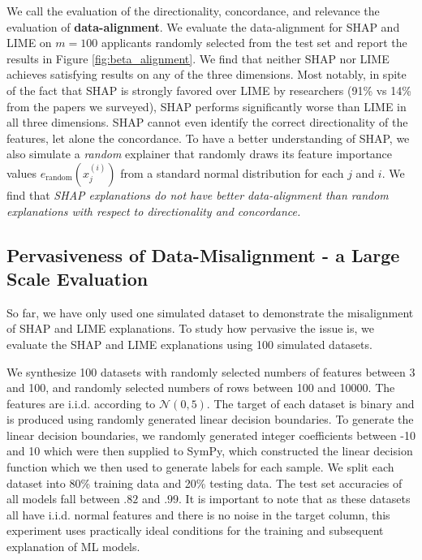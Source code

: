 \documentclass[mnsc,blindrev]{informs3}
\begin{document}
  We call the evaluation of the directionality, concordance, and relevance the evaluation of \textbf{data-alignment}. We evaluate the data-alignment
 for SHAP and LIME on $m=100$ applicants randomly selected from the test set and report the results in Figure \ref{fig:beta_alignment}. 
 We find that neither SHAP nor LIME achieves satisfying results on any of the three dimensions. Most notably, in spite of the fact that SHAP is strongly favored over LIME by researchers (91\% vs 14\% from the papers we surveyed), SHAP performs significantly worse than LIME in all three dimensions. SHAP cannot even identify the correct directionality of the features, let alone the concordance. To have a better understanding of SHAP, we also simulate a \emph{random} explainer that randomly draws its feature importance values $e_\text{random}(x^{(i)}_j)$ from a standard normal distribution for each $j$ and $i$. We find that \emph{SHAP explanations do not have better data-alignment than random explanations  with respect to directionality and concordance.}         


\subsection{Pervasiveness of Data-Misalignment - a Large Scale Evaluation}
    \label{sec:pervasive}
    So far, we have only used one simulated dataset to demonstrate the misalignment of SHAP and LIME explanations. To study how pervasive the issue is, %
    we evaluate the SHAP and LIME explanations using 100 simulated datasets.
    
    We synthesize 100 datasets with randomly selected numbers of features between 3 and 100, and randomly selected numbers of rows between 100 and 10000. The features are i.i.d. according to $\mathcal{N}(0,5)$. The target of each dataset is binary and is produced using randomly generated linear decision boundaries. To generate the linear decision boundaries, we randomly generated integer coefficients between -10 and 10 which were then supplied to SymPy, which constructed the linear decision function which we then used to generate labels for each sample.  %
    We split each dataset into 80\% training data and 20\% testing data.  The test set accuracies of all models fall between $.82$ and $.99$. It is important to note that as these datasets all have i.i.d. normal features and there is no noise in the target column, this experiment uses practically ideal conditions for the training and subsequent explanation of ML models.
\end{document}
